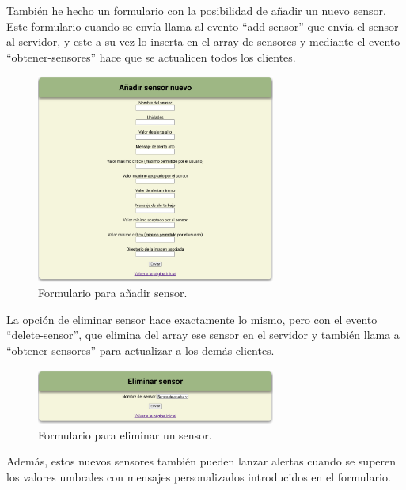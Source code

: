 \documentclass{article}
\begin{document}
También he hecho un formulario con la posibilidad de añadir un nuevo sensor. Este formulario cuando se envía llama al evento ``add-sensor'' que envía el sensor al servidor, y este a su vez lo inserta en el array de sensores y mediante el evento ``obtener-sensores'' hace que se actualicen todos los clientes. 

\begin{figure}[H]
    \centering
    \includegraphics[width=0.7\textwidth]{images/addsensor.png}
    \caption{Formulario para añadir sensor.}
\end{figure}

La opción de eliminar sensor hace exactamente lo mismo, pero con el evento ``delete-sensor'', que elimina del array ese sensor en el servidor y también llama a ``obtener-sensores'' para actualizar a los demás clientes.

\begin{figure}[H]
    \centering
    \includegraphics[width=0.7\textwidth]{images/deletesensorform.png}
    \caption{Formulario para eliminar un sensor.}
\end{figure}

Además, estos nuevos sensores también pueden lanzar alertas cuando se superen los valores umbrales con mensajes personalizados introducidos en el formulario.
\end{document}
